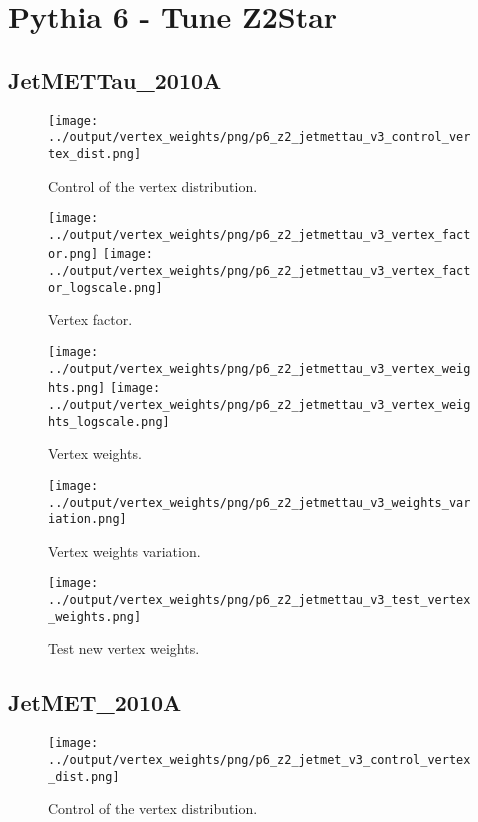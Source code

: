 \documentclass[11pt]{book}
\begin{document}
\section{Pythia 6 - Tune Z2Star}
\subsection{JetMETTau\_2010A}
\begin{figure}[ht]
\centering
\texttt{[image: ../output/vertex\_weights/png/p6\_z2\_jetmettau\_v3\_control\_vertex\_dist.png]}
\caption{Control of the vertex distribution.}
\end{figure}

\begin{figure}[ht]
\centering
\texttt{[image: ../output/vertex\_weights/png/p6\_z2\_jetmettau\_v3\_vertex\_factor.png]}
\texttt{[image: ../output/vertex\_weights/png/p6\_z2\_jetmettau\_v3\_vertex\_factor\_logscale.png]}
\caption{Vertex factor.}
\end{figure}

\begin{figure}[ht]
\centering
\texttt{[image: ../output/vertex\_weights/png/p6\_z2\_jetmettau\_v3\_vertex\_weights.png]}
\texttt{[image: ../output/vertex\_weights/png/p6\_z2\_jetmettau\_v3\_vertex\_weights\_logscale.png]}
\caption{Vertex weights.}
\end{figure}

\begin{figure}[ht]
\centering
\texttt{[image: ../output/vertex\_weights/png/p6\_z2\_jetmettau\_v3\_weights\_variation.png]}
\caption{Vertex weights variation.}
\end{figure}

\begin{figure}[ht]
\centering
\texttt{[image: ../output/vertex\_weights/png/p6\_z2\_jetmettau\_v3\_test\_vertex\_weights.png]}
\caption{Test new vertex weights.}
\end{figure}
\clearpage

\subsection{JetMET\_2010A}
\begin{figure}[ht]
\centering
\texttt{[image: ../output/vertex\_weights/png/p6\_z2\_jetmet\_v3\_control\_vertex\_dist.png]}
\caption{Control of the vertex distribution.}
\end{figure}
\end{document}

